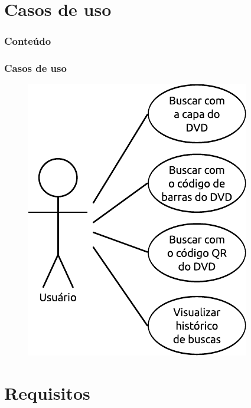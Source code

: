 \documentclass[14pt,beamer]{beamer}
\begin{document}
\section{Casos de uso}

\begin{frame}
	\frametitle{Conteúdo}
    \begin{multicols}{2}
        \small
    \end{multicols}
\end{frame}

\begin{frame}
	\frametitle{Casos de uso}
    
    \begin{figure}
        \centering
        \includegraphics[scale=1]{imagens/caso1.pdf}
    \end{figure}
\end{frame}

\section{Requisitos}
\end{document}
